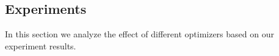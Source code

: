 \subsection{Experiments}

\noindent In this section we analyze the effect of different optimizers based on our experiment results.
